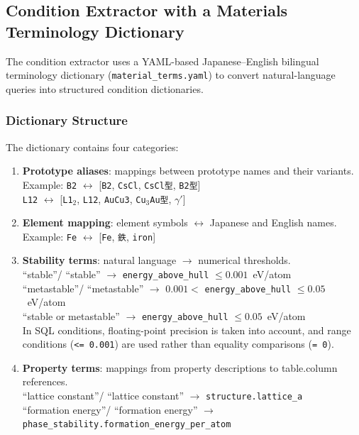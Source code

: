 \documentclass[5p,twocolumn]{elsarticle}
\begin{document}
\subsection{Condition Extractor with a Materials Terminology Dictionary}
\label{sec:entity_extractor}

The condition extractor uses a YAML-based Japanese--English bilingual terminology dictionary (\texttt{material\_terms.yaml})
to convert natural-language queries into structured condition dictionaries.

\subsubsection{Dictionary Structure}

The dictionary contains four categories:

\begin{enumerate}
  \item \textbf{Prototype aliases}: mappings between prototype names and their variants.\\
    Example: \texttt{B2} $\leftrightarrow$ [\texttt{B2}, \texttt{CsCl}, \texttt{CsCl型}, \texttt{B2型}]\\
    \texttt{L12} $\leftrightarrow$ [\texttt{L1$_2$}, \texttt{L12}, \texttt{AuCu3}, \texttt{Cu$_3$Au型}, \texttt{$\gamma'$}]

  \item \textbf{Element mapping}: element symbols $\leftrightarrow$ Japanese and English names.\\
    Example: \texttt{Fe} $\leftrightarrow$ [\texttt{Fe}, \texttt{鉄}, \texttt{iron}]

  \item \textbf{Stability terms}: natural language $\to$ numerical thresholds.\\
    ``stable''/ ``stable'' $\to$ \texttt{energy\_above\_hull} $\leq 0.001$~eV/atom\\
    ``metastable''/ ``metastable'' $\to$ $0.001 <$ \texttt{energy\_above\_hull} $\leq 0.05$~eV/atom\\
    ``stable or metastable'' $\to$ \texttt{energy\_above\_hull} $\leq 0.05$~eV/atom\\
    In SQL conditions, floating-point precision is taken into account, and range conditions
    (\texttt{<= 0.001}) are used rather than equality comparisons (\texttt{= 0}).

  \item \textbf{Property terms}: mappings from property descriptions to table.column references.\\
    ``lattice constant''/ ``lattice constant'' $\to$ \texttt{structure.lattice\_a}\\
    ``formation energy''/ ``formation energy'' $\to$ \texttt{phase\_stability.formation\_energy\_per\_atom}
\end{enumerate}
\end{document}
